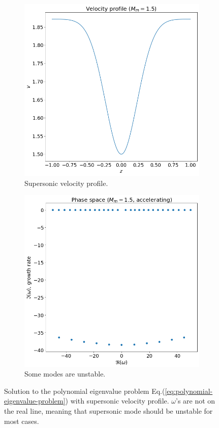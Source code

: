 \documentclass{article}
\theoremstyle{plain}
\theoremstyle{definition}
\theoremstyle{remark}
\theoremstyle{remark}
\begin{document}
\begin{figure}[H]
    \centering
    \begin{subfigure}[b]{0.5\linewidth}
        \includegraphics[width=\linewidth]{img/velocity-profile-supersonic.png}
        \caption{Supersonic velocity profile.}
    \end{subfigure}%
    \begin{subfigure}[b]{0.5\linewidth}
        \includegraphics[width=\linewidth]{img/phase-space-supersonic.png}
        \caption{Some modes are unstable.}
    \end{subfigure}
    \caption{Solution to the polynomial eigenvalue problem Eq.(\ref{eq:polynomial-eigenvalue-problem}) with supersonic velocity profile. $\omega$'s are not on the real line, meaning that supersonic mode should be unstable for most cases.}
    \label{fig:supersonic}
\end{figure}
\end{document}
